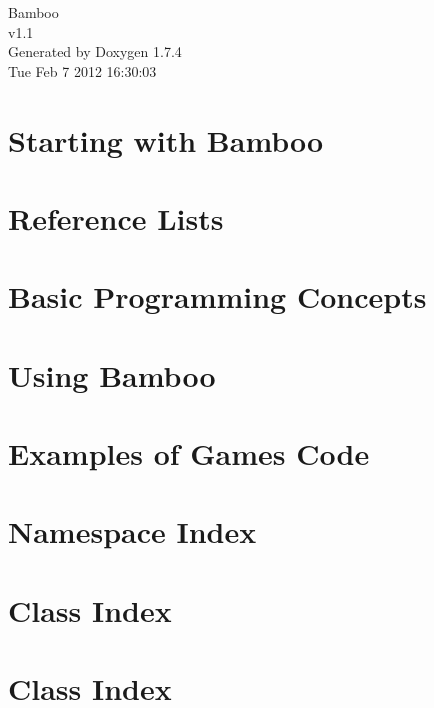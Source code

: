\documentclass[a4paper]{book}
\begin{document}
\hypersetup{pageanchor=false}
\begin{titlepage}
\vspace*{7cm}
\begin{center}
{\Large Bamboo \\[1ex]\large v1.1 }\\
\vspace*{1cm}
{\large Generated by Doxygen 1.7.4}\\
\vspace*{0.5cm}
{\small Tue Feb 7 2012 16:30:03}\\
\end{center}
\end{titlepage}
\clearemptydoublepage
{}
\tableofcontents
\clearemptydoublepage
{}
\hypersetup{pageanchor=true}
\chapter{Starting with Bamboo}
\label{index}\hypertarget{index}{}
\chapter{Reference Lists}
\label{ReferenceLists}
\hypertarget{ReferenceLists}{}

\chapter{Basic Programming Concepts}
\label{ProgrammingBasics}
\hypertarget{ProgrammingBasics}{}

\chapter{Using Bamboo}
\label{UsingEnginePage}
\hypertarget{UsingEnginePage}{}

\chapter{Examples of Games Code}
\label{CodeProgramExamples}
\hypertarget{CodeProgramExamples}{}

\chapter{Namespace Index}

\chapter{Class Index}

\chapter{Class Index}

\end{document}
